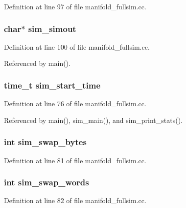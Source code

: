 Definition at line 97 of file manifold\_\-fullsim.cc.
\subsubsection[{sim\_\-simout}]{\setlength{\rightskip}{0pt plus 5cm}char$\ast$ {\bf sim\_\-simout}}\label{sim_8h_09cbb844712d19de24f7ec8a414d4266}




Definition at line 100 of file manifold\_\-fullsim.cc.

Referenced by main().
\subsubsection[{sim\_\-start\_\-time}]{\setlength{\rightskip}{0pt plus 5cm}time\_\-t {\bf sim\_\-start\_\-time}}\label{sim_8h_e8d0794b6bec1dfbd28ca90a7a08d2b4}




Definition at line 76 of file manifold\_\-fullsim.cc.

Referenced by main(), sim\_\-main(), and sim\_\-print\_\-stats().
\subsubsection[{sim\_\-swap\_\-bytes}]{\setlength{\rightskip}{0pt plus 5cm}int {\bf sim\_\-swap\_\-bytes}}\label{sim_8h_feede3aab9267fb42b819ad7bc47247a}




Definition at line 81 of file manifold\_\-fullsim.cc.
\subsubsection[{sim\_\-swap\_\-words}]{\setlength{\rightskip}{0pt plus 5cm}int {\bf sim\_\-swap\_\-words}}\label{sim_8h_a1267d1f1ee712bf4d37a9f7c4d2e913}




Definition at line 82 of file manifold\_\-fullsim.cc.
